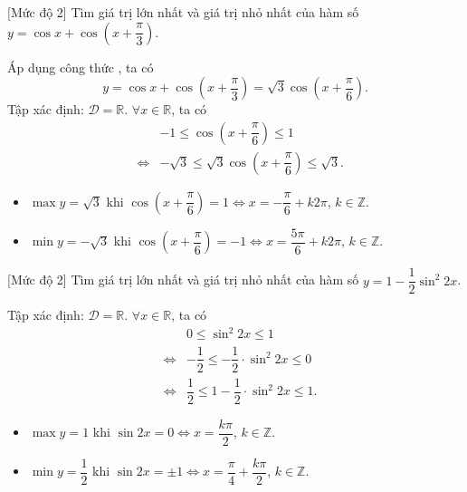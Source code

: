 \begin{bt}%
	[Mức độ 2]
	Tìm giá trị lớn nhất và giá trị nhỏ nhất của hàm số $ y=\cos x+\cos \left(x+\dfrac{\pi}{3}\right) $.
	\loigiai
	{
		Áp dụng công thức , ta có
		\begin{equation*}
			y=\cos x+\cos \left (x+\dfrac{\pi}{3}\right )=\sqrt{3}\cos \left (x+\dfrac{\pi}{6}\right ).
		\end{equation*}
		Tập xác định: $ \mathscr{D}=\mathbb{R}$. $ \forall x \in \mathbb{R} $, ta có
		\begin{eqnarray*}
			&&-1 \leq \cos \left (x+\dfrac{\pi}{6}\right ) \leq 1\\
			&\Leftrightarrow&  -\sqrt{3} \leq \sqrt{3}\cos \left (x+\dfrac{\pi}{6}\right ) \leq \sqrt{3}.
		\end{eqnarray*}
	\begin{itemize}
		\item $ \max y=\sqrt{3} $ khi $ \cos \left (x+\dfrac{\pi}{6}\right ) =1 \Leftrightarrow x=-\dfrac{\pi}{6}+k2\pi$, $k\in \mathbb{Z}$.
		\item $ \min y=-\sqrt{3} $ khi $ \cos \left (x+\dfrac{\pi}{6}\right )=-1 \Leftrightarrow x=\dfrac{5\pi}{6}+k2\pi$, $k\in \mathbb{Z}$.
	\end{itemize}
	}
\end{bt}

\begin{bt}%
	[Mức độ 2]
	Tìm giá trị lớn nhất và giá trị nhỏ nhất của hàm số $ y=1-\dfrac{1}{2} \sin^2 2 x $.
	\loigiai
	{
		Tập xác định: $ \mathscr{D}=\mathbb{R}$. $ \forall x \in \mathbb{R} $, ta có 
		\begin{eqnarray*}
			&& 0 \leq  \sin^2 2 x \leq 1\\
			&\Leftrightarrow& -\dfrac{1}{2} \leq  -\dfrac{1}{2}\cdot\sin^2 2 x \leq 0\\
			&\Leftrightarrow& \dfrac{1}{2} \leq  1-\dfrac{1}{2}\cdot\sin^2 2 x \leq 1.
		\end{eqnarray*}
	\begin{itemize}
		\item $ \max y=1 $ khi $ \sin  2 x=0 \Leftrightarrow x=\dfrac{k\pi}{2}$, $k\in \mathbb{Z}$.
		\item $ \min y=\dfrac{1}{2} $ khi $ \sin  2 x=\pm1 \Leftrightarrow x=\dfrac{\pi}{4}+\dfrac{k\pi}{2}$, $k\in \mathbb{Z}$.
	\end{itemize}
	}
\end{bt}

